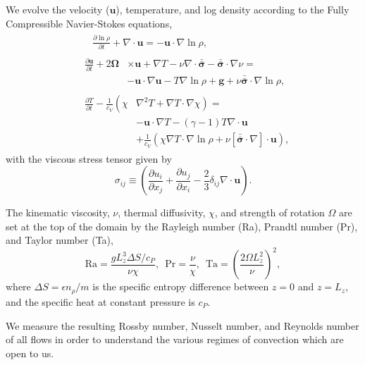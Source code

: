 \documentclass[twocolumn, amsmath, amsfonts, amssymb]{aastex62}
\newcommand{\grad}{\ensuremath{\nabla}}
\newcommand{\lilstressT}{\ensuremath{\bm{\bar{\bar{\sigma}}}}}
\begin{document}
We evolve the velocity ($\bm{u}$), temperature, and log density according to the
Fully Compressible Navier-Stokes equations,
\begin{align}
&\begin{aligned}
&\frac{\partial \ln\rho}{\partial t} + \grad\cdot\bm{u} 
    = -\bm{u}\cdot\grad\ln\rho,
	\label{eqn:continuity_eqn}
\end{aligned}\\
&\begin{aligned}
\frac{\partial\bm{u}}{\partial t} + 2\bm{\Omega}&\times\bm{u} + \grad T - 
\nu\grad\cdot\lilstressT - \lilstressT\cdot\grad\nu = \\
&-\bm{u}\cdot\grad\bm{u} - T\grad\ln\rho + \bm{g} + 
\nu\lilstressT\cdot\grad\ln\rho,
\label{eqn:momentum_eqn}
\end{aligned}\\
&\begin{aligned}
\frac{\partial T}{\partial t} -\frac{1}{c_V}\left(\right.\chi&\left.
    \grad^2 T + \grad T\cdot\grad\chi\right) = \\
	&-\bm{u}\cdot\grad T - (\gamma-1)T\grad\cdot{\bm{u}} \\
	&+ \frac{1}{c_V}\left(\chi\grad T \cdot\grad\ln\rho +
	\nu\left[\lilstressT\cdot\nabla\right]\cdot\bm{u}\right), 
	\label{eqn:energy_eqn}
\end{aligned}
\end{align}
with the viscous stress tensor given by
\begin{equation}
\sigma_{ij} \equiv \left(\frac{\partial u_i}{\partial x_j} + 
\frac{\partial u_j}{\partial x_i} - \frac{2}{3}\delta_{ij}\grad\cdot\bm{u}\right).
	\label{eqn:stress_tensor}
\end{equation}

The kinematic viscosity, $\nu$, thermal diffusivity, $\chi$, and strength of
rotation $\Omega$ are set at the top of the domain by the Rayleigh number
(Ra), Prandtl number (Pr), and Taylor number (Ta),
\begin{equation}
\text{Ra} = \frac{g L_z^3 \Delta S / c_P}{\nu \chi}, \,\,\,
\text{Pr} = \frac{\nu}{\chi}, \,\,\,
\text{Ta} = \left(\frac{2 \Omega L_z^2}{\nu}\right)^2,
\end{equation}
where $\Delta S = \epsilon n_\rho / m$ is the specific entropy difference between
$z = 0$ and $z = L_z$, and the specific heat at constant pressure is $c_P$.




We measure the resulting Rossby number, Nusselt number, and Reynolds number of all flows in order to
understand the various regimes of convection which are open to us.
\end{document}
